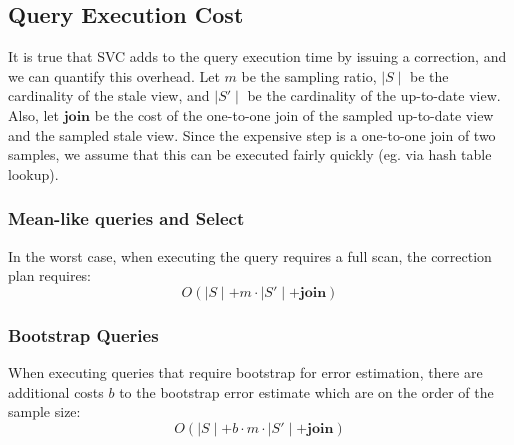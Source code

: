 \subsection{Query Execution Cost}
It is true that SVC adds to the query execution time by issuing a correction, and we can quantify this overhead. Let $m$ be the sampling ratio, $\mid S \mid$ be the cardinality of the stale view, and $\mid S' \mid$ be the cardinality  of the up-to-date view. Also, let $\textbf{join}$ be the cost of the one-to-one join of the sampled up-to-date view and the sampled stale view. Since the expensive step is a one-to-one join of two samples, we assume that this can be executed fairly quickly (eg. via hash table lookup).

\subsubsection{Mean-like queries and Select}
In the worst case, when executing the query requires a full scan, the correction plan requires:
 \[O(\mid S \mid + m \cdot \mid S' \mid + \textbf{join})\]

 \subsubsection{Bootstrap Queries}
When executing queries that require bootstrap for error estimation, there are additional costs $b$ to the bootstrap error estimate which are on the order of the sample size:
 \[O(\mid S \mid + b\cdot m \cdot \mid S' \mid + \textbf{join})\]

